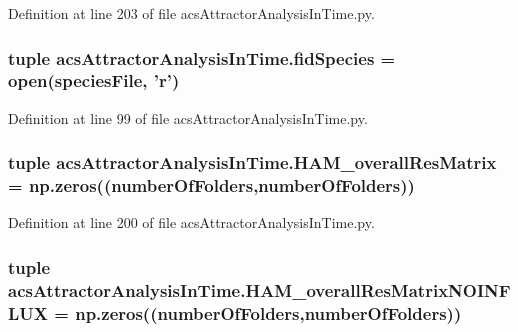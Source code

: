 Definition at line 203 of file acs\-Attractor\-Analysis\-In\-Time.\-py.

\hypertarget{a00092_a70d70b9ab98e722475b03465c7f8dbbe}{
\subsubsection[{fid\-Species}]{\setlength{\rightskip}{0pt plus 5cm}tuple acs\-Attractor\-Analysis\-In\-Time.\-fid\-Species = open({\bf species\-File}, '{\bf r}')}}\label{a00092_a70d70b9ab98e722475b03465c7f8dbbe}


Definition at line 99 of file acs\-Attractor\-Analysis\-In\-Time.\-py.

\hypertarget{a00092_a5e8d5d65865736555e76c3f04058ddd9}{
\subsubsection[{H\-A\-M\-\_\-overall\-Res\-Matrix}]{\setlength{\rightskip}{0pt plus 5cm}tuple acs\-Attractor\-Analysis\-In\-Time.\-H\-A\-M\-\_\-overall\-Res\-Matrix = np.\-zeros(({\bf number\-Of\-Folders},{\bf number\-Of\-Folders}))}}\label{a00092_a5e8d5d65865736555e76c3f04058ddd9}


Definition at line 200 of file acs\-Attractor\-Analysis\-In\-Time.\-py.

\hypertarget{a00092_a6ea74abf4c94200ed1b27d892ecacc97}{
\subsubsection[{H\-A\-M\-\_\-overall\-Res\-Matrix\-N\-O\-I\-N\-F\-L\-U\-X}]{\setlength{\rightskip}{0pt plus 5cm}tuple acs\-Attractor\-Analysis\-In\-Time.\-H\-A\-M\-\_\-overall\-Res\-Matrix\-N\-O\-I\-N\-F\-L\-U\-X = np.\-zeros(({\bf number\-Of\-Folders},{\bf number\-Of\-Folders}))}}\label{a00092_a6ea74abf4c94200ed1b27d892ecacc97}


